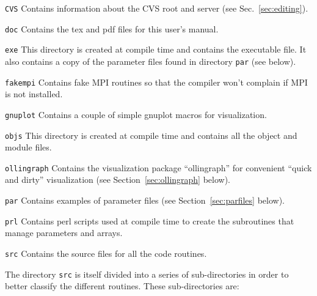 \documentclass[12pt]{article}
\begin{document}
\begin{list}{}{
\setlength{\leftmargin}{40mm}
\setlength{\labelsep}{10mm}
\setlength{\labelwidth}{25mm}}

\item[\texttt{CVS}] Contains information about the CVS root and server (see
Sec.~\ref{sec:editing}).

\item[\texttt{doc}] Contains the tex and pdf files for this user's
  manual.

\item[\texttt{exe}] This directory is created at compile time and
  contains the executable file.  It also contains a copy of the
  parameter files found in directory \texttt{par} (see below).

\item[\texttt{fakempi}] Contains fake MPI routines so that the
  compiler won't complain if MPI is not installed.

\item[\texttt{gnuplot}] Contains a couple of simple gnuplot macros for
  visualization.

\item[\texttt{objs}] This directory is created at compile time and
  contains all the object and module files.

\item[\texttt{ollingraph}] Contains the visualization package
  ``ollingraph'' for convenient ``quick and dirty'' visualization (see
  Section~\ref{sec:ollingraph} below).

\item[\texttt{par}] Contains examples of parameter files (see
Section~\ref{sec:parfiles} below).

\item[\texttt{prl}] Contains perl scripts used at compile time to
  create the subroutines that manage parameters and arrays.

\item[\texttt{src}] Contains the source files for all the code routines.

\end{list}


The directory \texttt{src} is itself divided into a series of
sub-directories in order to better classify the different
routines. These sub-directories are:
\end{document}
